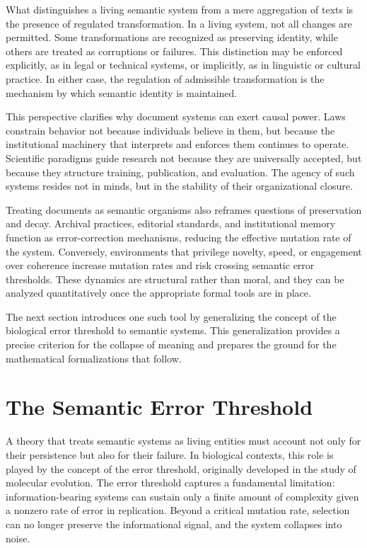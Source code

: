 \documentclass[11pt,oneside]{article}
\begin{document}
What distinguishes a living semantic system from a mere aggregation of texts is the presence of regulated transformation. In a living system, not all changes are permitted. Some transformations are recognized as preserving identity, while others are treated as corruptions or failures. This distinction may be enforced explicitly, as in legal or technical systems, or implicitly, as in linguistic or cultural practice. In either case, the regulation of admissible transformation is the mechanism by which semantic identity is maintained.

This perspective clarifies why document systems can exert causal power. Laws constrain behavior not because individuals believe in them, but because the institutional machinery that interprets and enforces them continues to operate. Scientific paradigms guide research not because they are universally accepted, but because they structure training, publication, and evaluation. The agency of such systems resides not in minds, but in the stability of their organizational closure.

Treating documents as semantic organisms also reframes questions of preservation and decay. Archival practices, editorial standards, and institutional memory function as error-correction mechanisms, reducing the effective mutation rate of the system. Conversely, environments that privilege novelty, speed, or engagement over coherence increase mutation rates and risk crossing semantic error thresholds. These dynamics are structural rather than moral, and they can be analyzed quantitatively once the appropriate formal tools are in place.

The next section introduces one such tool by generalizing the concept of the biological error threshold to semantic systems. This generalization provides a precise criterion for the collapse of meaning and prepares the ground for the mathematical formalizations that follow.


\section{The Semantic Error Threshold} 

A theory that treats semantic systems as living entities must account not only for their persistence but also for their failure. In biological contexts, this role is played by the concept of the error threshold, originally developed in the study of molecular evolution. The error threshold captures a fundamental limitation: information-bearing systems can sustain only a finite amount of complexity given a nonzero rate of error in replication. Beyond a critical mutation rate, selection can no longer preserve the informational signal, and the system collapses into noise.
\end{document}
